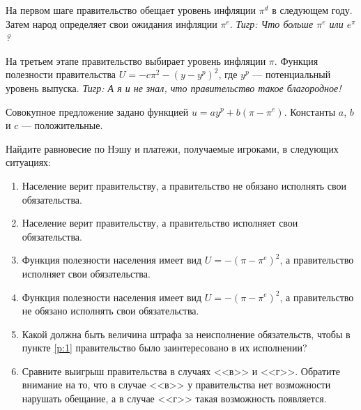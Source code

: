 \begin{problem}
На первом шаге правительство обещает уровень инфляции  $\pi ^{d} $  в следующем году. Затем народ определяет свои ожидания инфляции  $\pi ^{e} $. {\it Тигр: Что больше  $\pi ^{e} $  или  $e^{\pi } $?}\par
На третьем этапе правительство выбирает уровень инфляции  $\pi $.
Функция полезности правительства  $U=-c\pi ^{2} -\left(y-y^{p} \right)^{2} $, где  $y^{p} $  --- потенциальный уровень выпуска. {\it Тигр: А я и не знал, что правительство такое благородное!}\par
Совокупное предложение задано функцией  $u=ay^{p} +b\left(\pi -\pi ^{e} \right)$. Константы  $a$,  $b$  и  $c$  --- положительные.\par
Найдите равновесие по Нэшу и платежи, получаемые игроками, в следующих ситуациях:\par
\begin{enumerate}
\item       Население верит правительству, а правительство не обязано исполнять свои обязательства.\par
\item      Население верит правительству, а правительство исполняет свои обязательства.\par
\item       Функция полезности населения имеет вид  $U=-\left(\pi -\pi ^{e} \right)^{2} $, а правительство исполняет свои обязательства.\par
\item\label{p:1}      Функция полезности населения имеет вид  $U=-\left(\pi -\pi ^{e} \right)^{2} $, а правительство не обязано исполнять свои обязательства.\par
\item      Какой должна быть величина штрафа за неисполнение обязательств, чтобы в пункте \ref{p:1} правительство было заинтересовано в их исполнении?\par
\item      Сравните выигрыш правительства в случаях <<в>> и <<г>>. Обратите внимание на то, что в случае <<в>> у правительства нет возможности нарушать обещание, а в случае <<г>> такая возможность появляется.
\end{enumerate}


\begin{sol}

\end{sol}
\end{problem}



